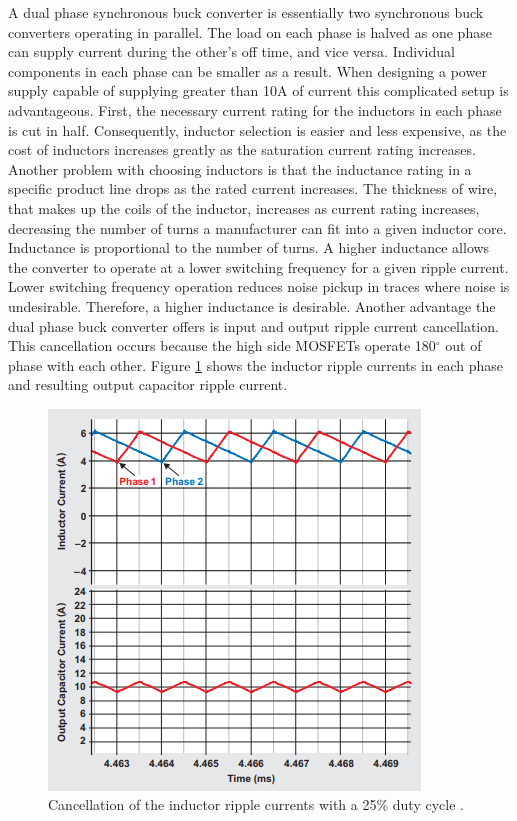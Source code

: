 \documentclass[11pt]{article}
\begin{document}
    \noindent A dual phase synchronous buck converter is essentially two synchronous buck converters operating in parallel. The load on each phase is halved as one phase can supply current during the other's off time, and  vice versa. Individual components in each phase can be smaller as a result. When designing a power supply capable of supplying greater than 10A of current this complicated setup is advantageous. First, the necessary current rating for the inductors in each phase is cut in half. Consequently, inductor selection is easier and less expensive, as the cost of inductors increases greatly as the saturation current rating increases. Another problem with choosing inductors is that the inductance rating in a specific product line drops as the rated current increases. The thickness of wire, that makes up the coils of the inductor, increases as current rating increases, decreasing the number of turns a manufacturer can fit into a given inductor core. Inductance is proportional to the number of turns. A higher inductance allows the converter to operate at a lower switching frequency for a given ripple current. Lower switching frequency operation reduces noise pickup in traces where noise is undesirable. Therefore, a higher inductance is desirable.
    \newline
    \newline
    \noindent Another advantage the dual phase buck converter offers is input and output ripple current cancellation. This cancellation occurs because the high side MOSFETs operate 180$^{\circ}$ out of phase with each other. Figure \ref{outripple} shows the inductor ripple currents in each phase and resulting output capacitor ripple current.
    
    \begin{figure}[H]
            \centering
            \includegraphics[width=0.5\linewidth]{outputripplecap.PNG}
            \caption{Cancellation of the inductor ripple currents with a 25\% duty cycle \cite{david_baba_benefits_2012}.}
            \label{outripple}
        \end{figure}
        
\end{document}
